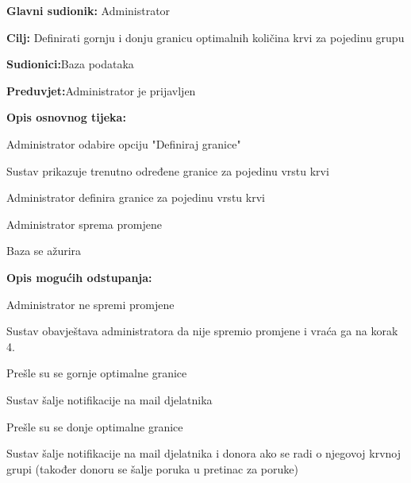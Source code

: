 \noindent {}
\begin{packed_item}
	
	\item \textbf{Glavni sudionik: }{Administrator}
	\item  \textbf{Cilj:} {Definirati gornju i donju granicu optimalnih količina krvi za pojedinu grupu}
	\item  \textbf{Sudionici:}{Baza podataka}
	\item  \textbf{Preduvjet:}{Administrator je prijavljen}
	\item  \textbf{Opis osnovnog tijeka:}
	
	\item[] \begin{packed_enum}
		
		\item {Administrator odabire opciju "Definiraj granice"}
		\item {Sustav prikazuje trenutno određene granice za pojedinu vrstu krvi} 
		\item {Administrator definira granice za pojedinu vrstu krvi}
		\item {Administrator sprema promjene}
		\item {Baza se ažurira}
		\end{packed_enum}
	\item  \textbf{Opis mogućih odstupanja:}
	
		\item[] \begin{packed_item}
		
			\item[4.a] {Administrator ne spremi promjene}
				\item[] \begin{packed_enum}
			
				\item Sustav obavještava administratora da nije spremio promjene i vraća ga na korak 4. 
				\end{packed_enum}
			\item[4.b] {Prešle su se gornje optimalne granice}	
				\item[] \begin{packed_enum}
			
				\item Sustav šalje notifikacije na mail djelatnika			
				\end{packed_enum}
			\item[4.c] {Prešle su se donje optimalne granice}	
				\item[] \begin{packed_enum}
			
				\item Sustav šalje notifikacije na mail djelatnika i donora ako se radi o njegovoj krvnoj grupi (također donoru se šalje poruka u pretinac za poruke)
				\end{packed_enum}
		
		
			\end{packed_item}
\end{packed_item}
